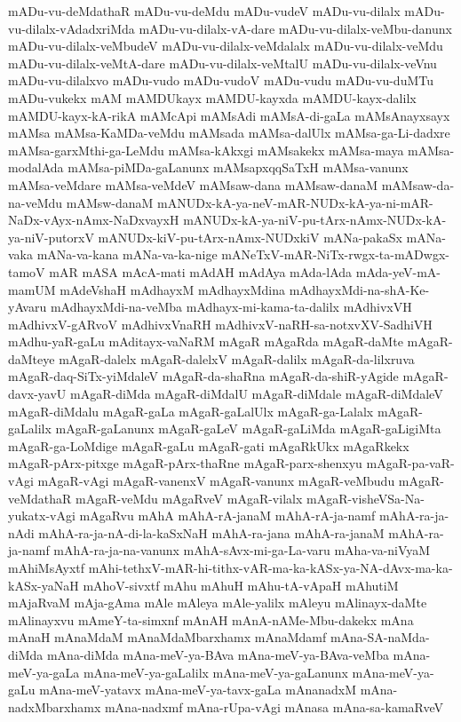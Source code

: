 {mADu-vu-deMdathaR
mADu-vu-deMdu
mADu-vudeV
mADu-vu-dilalx
mADu-vu-dilalx-vAdadxriMda
mADu-vu-dilalx-vA-dare
mADu-vu-dilalx-veMbu-danunx
mADu-vu-dilalx-veMbudeV
mADu-vu-dilalx-veMdalalx
mADu-vu-dilalx-veMdu
mADu-vu-dilalx-veMtA-dare
mADu-vu-dilalx-veMtalU
mADu-vu-dilalx-veVnu
mADu-vu-dilalxvo
mADu-vudo
mADu-vudoV
mADu-vudu
mADu-vu-duMTu
mADu-vukekx
mAM
mAMDUkayx
mAMDU-kayxda
mAMDU-kayx-dalilx
mAMDU-kayx-kA-rikA
mAMcApi
mAMsAdi
mAMsA-di-gaLa
mAMsAnayxsayx
mAMsa
mAMsa-KaMDa-veMdu
mAMsada
mAMsa-dalUlx
mAMsa-ga-Li-dadxre
mAMsa-garxMthi-ga-LeMdu
mAMsa-kAkxgi
mAMsakekx
mAMsa-maya
mAMsa-modalAda
mAMsa-piMDa-gaLanunx
mAMsapxqqSaTxH
mAMsa-vanunx
mAMsa-veMdare
mAMsa-veMdeV
mAMsaw-dana
mAMsaw-danaM
mAMsaw-da-na-veMdu
mAMsw-danaM
mANUDx-kA-ya-neV-mAR-NUDx-kA-ya-ni-mAR-NaDx-vAyx-nAmx-NaDxvayxH
mANUDx-kA-ya-niV-pu-tArx-nAmx-NUDx-kA-ya-niV-putorxV
mANUDx-kiV-pu-tArx-nAmx-NUDxkiV
mANa-pakaSx
mANa-vaka
mANa-va-kana
mANa-va-ka-nige
mANeTxV-mAR-NiTx-rwgx-ta-mADwgx-tamoV
mAR
mASA
mAcA-mati
mAdAH
mAdAya
mAda-lAda
mAda-yeV-mA-mamUM
mAdeVshaH
mAdhayxM
mAdhayxMdina
mAdhayxMdi-na-shA-Ke-yAvaru
mAdhayxMdi-na-veMba
mAdhayx-mi-kama-ta-dalilx
mAdhivxVH
mAdhivxV-gARvoV
mAdhivxVnaRH
mAdhivxV-naRH-sa-notxvXV-SadhiVH
mAdhu-yaR-gaLu
mAditayx-vaNaRM
mAgaR
mAgaRda
mAgaR-daMte
mAgaR-daMteye
mAgaR-dalelx
mAgaR-dalelxV
mAgaR-dalilx
mAgaR-da-lilxruva
mAgaR-daq-SiTx-yiMdaleV
mAgaR-da-shaRna
mAgaR-da-shiR-yAgide
mAgaR-davx-yavU
mAgaR-diMda
mAgaR-diMdalU
mAgaR-diMdale
mAgaR-diMdaleV
mAgaR-diMdalu
mAgaR-gaLa
mAgaR-gaLalUlx
mAgaR-ga-Lalalx
mAgaR-gaLalilx
mAgaR-gaLanunx
mAgaR-gaLeV
mAgaR-gaLiMda
mAgaR-gaLigiMta
mAgaR-ga-LoMdige
mAgaR-gaLu
mAgaR-gati
mAgaRkUkx
mAgaRkekx
mAgaR-pArx-pitxge
mAgaR-pArx-thaRne
mAgaR-parx-shenxyu
mAgaR-pa-vaR-vAgi
mAgaR-vAgi
mAgaR-vanenxV
mAgaR-vanunx
mAgaR-veMbudu
mAgaR-veMdathaR
mAgaR-veMdu
mAgaRveV
mAgaR-vilalx
mAgaR-visheVSa-Na-yukatx-vAgi
mAgaRvu
mAhA
mAhA-rA-janaM
mAhA-rA-ja-namf
mAhA-ra-ja-nAdi
mAhA-ra-ja-nA-di-la-kaSxNaH
mAhA-ra-jana
mAhA-ra-janaM
mAhA-ra-ja-namf
mAhA-ra-ja-na-vanunx
mAhA-sAvx-mi-ga-La-varu
mAha-va-niVyaM
mAhiMsAyxtf
mAhi-tethxV-mAR-hi-tithx-vAR-ma-ka-kASx-ya-NA-dAvx-ma-ka-kASx-yaNaH
mAhoV-sivxtf
mAhu
mAhuH
mAhu-tA-vApaH
mAhutiM
mAjaRvaM
mAja-gAma
mAle
mAleya
mAle-yalilx
mAleyu
mAlinayx-daMte
mAlinayxvu
mAmeY-ta-simxnf
mAnAH
mAnA-nAMe-Mbu-dakekx
mAna
mAnaH
mAnaMdaM
mAnaMdaMbarxhamx
mAnaMdamf
mAna-SA-naMda-diMda
mAna-diMda
mAna-meV-ya-BAva
mAna-meV-ya-BAva-veMba
mAna-meV-ya-gaLa
mAna-meV-ya-gaLalilx
mAna-meV-ya-gaLanunx
mAna-meV-ya-gaLu
mAna-meV-yatavx
mAna-meV-ya-tavx-gaLa
mAnanadxM
mAna-nadxMbarxhamx
mAna-nadxmf
mAna-rUpa-vAgi
mAnasa
mAna-sa-kamaRveV
}
